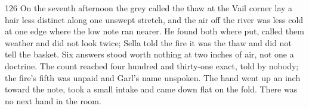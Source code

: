 \begin{CRchronicle}{126}
On the seventh afternoon the grey called the thaw at the Vail corner lay a hair less distinct along one unswept stretch, and the air off the river was less cold at one edge where the low note ran nearer. He found both where put, called them weather and did not look twice; Sella told the fire it was the thaw and did not tell the basket. Six answers stood worth nothing at two inches of air, not one a doctrine. The count reached four hundred and thirty-one exact, told by nobody; the fire’s fifth was unpaid and Garl’s name unspoken. The hand went up an inch toward the note, took a small intake and came down flat on the fold. There was no next hand in the room.
\end{CRchronicle}
